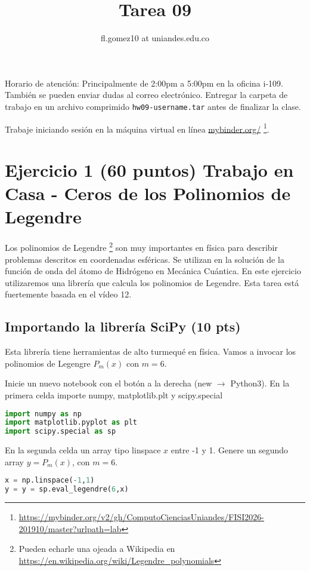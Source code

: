 \documentclass{article}
\title{Tarea 09}
\author{fl.gomez10 at uniandes.edu.co}
\begin{document}
\maketitle

Horario de atención: Principalmente de 2:00pm a 5:00pm en la oficina i-109.
También se pueden enviar dudas al correo electrónico.
Entregar la carpeta de trabajo en un archivo comprimido \texttt{hw09-username.tar}
antes de finalizar la clase. 

Trabaje iniciando  sesión en la máquina virtual en línea
\href{https://mybinder.org/v2/gh/ComputoCienciasUniandes/FISI2026-201910/master?urlpath=lab}{mybinder.org/}
\footnote{\url{https://mybinder.org/v2/gh/ComputoCienciasUniandes/FISI2026-201910/master?urlpath=lab}}. 


\section{Ejercicio 1 (60 puntos) Trabajo en Casa - Ceros de los Polinomios de Legendre}

Los polinomios de Legendre
\footnote{Pueden echarle una ojeada a Wikipedia en \url{https://en.wikipedia.org/wiki/Legendre_polynomials}}
son muy importantes en física para describir problemas descritos en coordenadas
esféricas. Se utilizan en la solución de la función de onda del átomo de Hidrógeno
en Mecánica Cuántica.
En este ejercicio utilizaremos una librería que calcula los polinomios de Legendre.
Esta tarea está fuertemente basada en el vídeo 12.

\subsection{Importando la librería SciPy (10 pts)}
Esta librería tiene herramientas de alto turmequé en física.
Vamos a invocar los polinomios de Legengre $P_m(x)$ con $m=6$.

Inicie un nuevo notebook con el botón a la derecha (new $\rightarrow$ Python3).
En la primera celda importe numpy, matplotlib.plt y scipy.special

\begin{lstlisting}[language=Python]
import numpy as np
import matplotlib.pyplot as plt
import scipy.special as sp
\end{lstlisting}

En la segunda celda un array tipo linspace $x$ entre -1 y 1.
Genere un segundo array $y=P_m(x)$, con $m = 6$.
\begin{lstlisting}[language=Python]
x = np.linspace(-1,1)
y = y = sp.eval_legendre(6,x)
\end{lstlisting}
\end{document}
